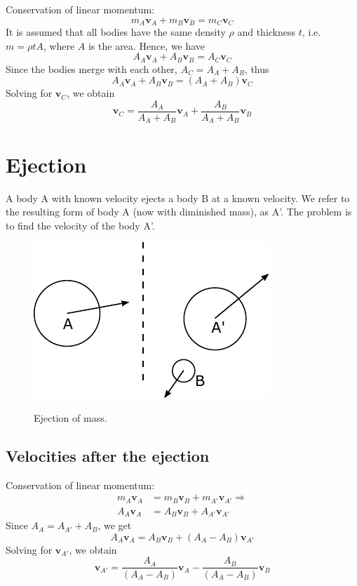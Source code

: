 \documentclass{article}
\newcommand{\vbs}[0]{\boldsymbol{v}}
\begin{document}
Conservation of linear momentum:
\begin{equation*}
m_A\vbs_A + m_B\vbs_B = m_C\vbs_C
\end{equation*}
It is assumed that all bodies have the same density $\rho$ and thickness $t$, i.e. $m = \rho t A$, where $A$ is the area. Hence, we have
\begin{equation*}
A_A\vbs_A + A_B\vbs_B = A_C\vbs_C
\end{equation*}
Since the bodies merge with each other, $A_C = A_A + A_B$, thus
\begin{equation*}
A_A\vbs_A + A_B\vbs_B = (A_A + A_B)\vbs_C
\end{equation*}
Solving for $\vbs_C$, we obtain
\begin{equation}
\label{eq:perfectly_inelastic_collision}
\vbs_C = \frac{A_A}{A_A + A_B}\vbs_A + \frac{A_B}{A_A + A_B}\vbs_B
\end{equation}

\section{Ejection}
A body A with known velocity ejects a body B at a known velocity. We refer to the resulting form of body A (now with diminished mass), as A'. The problem is to find the velocity of the body A'.

\begin{figure}[h]
	\centering
	{\includegraphics{figures/ejection.pdf}}
	\caption{Ejection of mass.}\label{fig:ejection}
\end{figure}

\subsection{Velocities after the ejection}

Conservation of linear momentum:
\begin{equation*}
\begin{split}
m_A\vbs_A &= m_B\vbs_B + m_{A'}\vbs_{A'}
\Rightarrow
\\A_A\vbs_A &= A_B\vbs_B + A_{A'}\vbs_{A'}
\end{split}
\end{equation*}
Since $A_A = A_{A'} + A_B$, we get
\begin{equation*}
A_A\vbs_A = A_B\vbs_B + (A_A - A_B)\vbs_{A'}
\end{equation*}
Solving for $\vbs_{A'}$, we obtain
\begin{equation}
\vbs_{A'} = \frac{A_A}{(A_A - A_B)}\vbs_A - \frac{A_B}{(A_A - A_B)}\vbs_B
\end{equation}
\end{document}
